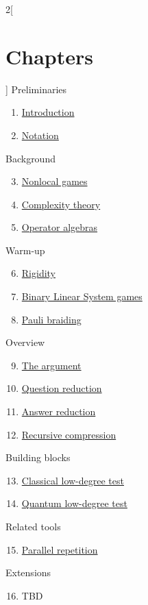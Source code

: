 \begin{multicols}{2}[\section{Chapters}]
\noindent
Preliminaries
\begin{enumerate}
\item \hyperref[introduction-section-phantom]{Introduction}
\item \hyperref[notation-section-phantom]{Notation}
\end{enumerate}
Background
\begin{enumerate}
\setcounter{enumi}{2}
\item \hyperref[nonlocalgames-section-phantom]{Nonlocal games}
\item \hyperref[complexitytheory-section-phantom]{Complexity theory}
\item \hyperref[operatoralgebras-section-phantom]{Operator algebras}
\end{enumerate}
Warm-up
\begin{enumerate}
\setcounter{enumi}{5}
\item \hyperref[rigidity-section-phantom]{Rigidity}
\item \hyperref[blsgames-section-phantom]{Binary Linear System games}
\item \hyperref[paulibraiding-section-phantom]{Pauli braiding}
\end{enumerate}
Overview
\begin{enumerate}
\setcounter{enumi}{8}
\item \hyperref[argument-section-phantom]{The argument}
\item \hyperref[questionreduction-section-phantom]{Question reduction}
\item \hyperref[answerreduction-section-phantom]{Answer reduction}
\item \hyperref[recursivecompression-section-phantom]{Recursive compression}
\end{enumerate}
Building blocks
\begin{enumerate}
\setcounter{enumi}{12}
\item \hyperref[classicalldt-section-phantom]{Classical low-degree test}
\item \hyperref[quantumldt-section-phantom]{Quantum low-degree test}
\end{enumerate}
Related tools
\begin{enumerate}
\setcounter{enumi}{14}
\item \hyperref[parallelrepetition-section-phantom]{Parallel repetition}
\end{enumerate}
Extensions
\begin{enumerate}
\setcounter{enumi}{15}
\item TBD
\end{enumerate}
\end{multicols}
